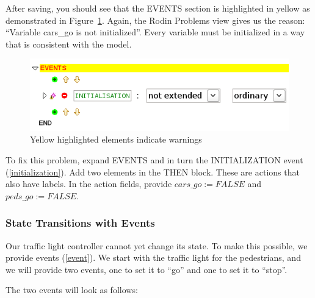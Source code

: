 After saving, you should see that the \textsf{EVENTS} section is highlighted in yellow as demonstrated in Figure~\ref{fig_tut_03_warning}.  Again, the \textsf{Rodin Problems} view gives us the reason: ``Variable cars\_go is not initialized''. Every variable must be initialized in a way that is consistent with the model.

\begin{figure}[!h]
\begin{center}
	\includegraphics[]{img/tutorial/tut_03_yellow.png}
	\caption{Yellow highlighted elements indicate warnings}
	\label{fig_tut_03_warning}
\end{center}
\end{figure}

To fix this problem, expand \textsf{EVENTS} and in turn the INITIALIZATION event (\ref{initialization}).  Add two elements in the \textsf{THEN} block.  These are actions that also have labels.  In the action fields, provide $cars\_go :=  FALSE$ and $peds\_go :=  FALSE$.


\subsubsection{State Transitions with Events}

Our traffic light controller cannot yet change its state.  To make this possible, we provide events (\ref{event}). We start with the traffic light for the pedestrians, and we will provide two events, one to set it to ``go'' and one to set it to ``stop''.


The two events will look as follows:

